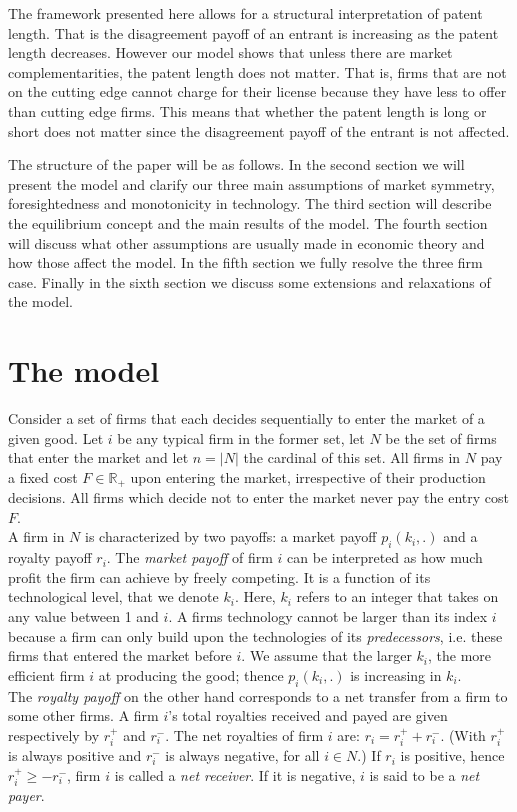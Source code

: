 \documentclass{article}
\begin{document}
The framework presented here allows for a structural interpretation of patent length. That is the disagreement payoff of an entrant is increasing as the patent length decreases. However our model shows that unless there are market complementarities, the patent length does not matter. That is, firms that are not on the cutting edge cannot charge for their license because they have less to offer than cutting edge firms. This means that whether the patent length is long or short does not matter since the disagreement payoff of the entrant is not affected. 

The structure of the paper will be as follows. In the second section we will present the model and clarify our three main assumptions of market symmetry, foresightedness and monotonicity in technology.  The third section will describe the equilibrium concept and the main results of the model. The fourth section will discuss what other assumptions are usually made in economic theory and how those affect the model. In the fifth section we fully resolve the three firm case. Finally in the sixth section we discuss some extensions and relaxations of the model. 

\section{The model}

\indent Consider a set of firms that each decides sequentially to enter the market of a given good. Let $i$ be any typical firm in the former set, let $N$ be the set of firms that enter the market and let $n=|N|$ the cardinal of this set. All firms in $N$ pay a fixed cost $F\in \mathbb{R}_+$ upon entering the market, irrespective of their production decisions. All firms which decide not to enter the market never pay the entry cost $F$.  \\

\indent A firm in $N$ is characterized by two payoffs: a market payoff $p_i(k_i,.)$ and a royalty payoff $r_i$. The \textit{market payoff} of firm $i$ can be interpreted as how much profit the firm can achieve by freely competing. It is a function of its technological level, that we denote $k_i$. Here, $k_i$ refers to an integer that takes on any value between 1 and $i$. A firms technology cannot be larger than its index $i$ because a firm can only build upon the technologies of its \textit{predecessors}, i.e. these firms that entered the market before $i$. We assume that the larger $k_i$, the more efficient firm $i$ at producing the good; thence $p_i(k_i,.)$ is increasing in $k_i$. \\
\indent The \textit{royalty payoff} on the other hand corresponds to a net transfer from a firm to some other firms. A firm $i$'s total royalties received and payed are given respectively by $r_i^+$ and $r_i^-$. The net royalties of firm $i$ are: $r_i=r_i^++r_i^-$. (With $r_i^+$ is always positive and $r_i^-$ is always negative, for all $i\in N$.) If $r_i$ is positive, hence $r^+_i\geq -r^-_i$, firm $i$ is called a \textit{net receiver}. If it is negative, $i$ is said to be a \textit{net payer}. \\
\end{document}
